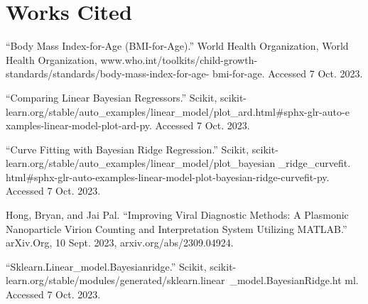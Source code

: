 \documentclass{article}
\begin{document}
\section{Works Cited}
“Body Mass Index-for-Age (BMI-for-Age).” World Health Organization, World Health
Organization, www.who.int/toolkits/child-growth-standards/standards/body-mass-index-for-age-
bmi-for-age. Accessed 7 Oct. 2023.

“Comparing Linear Bayesian Regressors.” Scikit,
scikit-learn.org/stable/auto\_examples/linear\_model/plot\_ard.html\#sphx-glr-auto-e
xamples-linear-model-plot-ard-py. Accessed 7 Oct. 2023.

“Curve Fitting with Bayesian Ridge Regression.” Scikit,
scikit-learn.org/stable/auto\_examples/linear\_model/plot\_bayesian
\_ridge\_curvefit.
html\#sphx-glr-auto-examples-linear-model-plot-bayesian-ridge-curvefit-py.
Accessed 7 Oct. 2023.

Hong, Bryan, and Jai Pal. “Improving Viral Diagnostic Methods: A Plasmonic
Nanoparticle Virion Counting and Interpretation System Utilizing MATLAB.”
arXiv.Org, 10 Sept. 2023, arxiv.org/abs/2309.04924.

“Sklearn.Linear\_model.Bayesianridge.” Scikit,
scikit-learn.org/stable/modules/generated/sklearn.linear\
\_model.BayesianRidge.ht
ml. Accessed 7 Oct. 2023.
\end{document}
